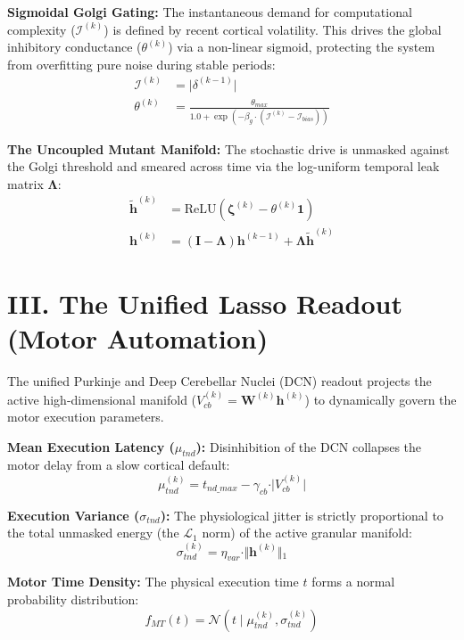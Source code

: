 \documentclass[11pt, a4paper]{article}
\begin{document}
\textbf{Sigmoidal Golgi Gating:} The instantaneous demand for computational complexity ($\mathcal{I}^{(k)}$) is defined by recent cortical volatility. This drives the global inhibitory conductance ($\theta^{(k)}$) via a non-linear sigmoid, protecting the system from overfitting pure noise during stable periods:
\begin{align}
\mathcal{I}^{(k)} &= \vert{}\delta^{(k-1)}\vert{} \\
\theta^{(k)} &= \frac{\theta_{max}}{1.0 + \exp\left(-\beta_g \cdot (\mathcal{I}^{(k)} - \mathcal{I}_{bias})\right)}
\end{align}

\textbf{The Uncoupled Mutant Manifold:} The stochastic drive is unmasked against the Golgi threshold and smeared across time via the log-uniform temporal leak matrix $\mathbf{\Lambda}$:
\begin{align}
\tilde{\mathbf{h}}^{(k)} &= \text{ReLU}\left( \mathbf{\zeta}^{(k)} - \theta^{(k)} \mathbf{1} \right) \\
\mathbf{h}^{(k)} &= (\mathbf{I} - \mathbf{\Lambda}) \mathbf{h}^{(k-1)} + \mathbf{\Lambda} \tilde{\mathbf{h}}^{(k)}
\end{align}

\section{III. The Unified Lasso Readout (Motor Automation)}
The unified Purkinje and Deep Cerebellar Nuclei (DCN) readout projects the active high-dimensional manifold ($V_{cb}^{(k)} = \mathbf{W}^{(k)} \mathbf{h}^{(k)}$) to dynamically govern the motor execution parameters.

\textbf{Mean Execution Latency ($\mu_{tnd}$):} Disinhibition of the DCN collapses the motor delay from a slow cortical default:
\begin{equation}
\mu_{tnd}^{(k)} = t_{nd\_max} - \gamma_{cb} \cdot \vert{}V_{cb}^{(k)}\vert{}
\end{equation}

\textbf{Execution Variance ($\sigma_{tnd}$):} The physiological jitter is strictly proportional to the total unmasked energy (the $\mathcal{L}_1$ norm) of the active granular manifold:
\begin{equation}
\sigma_{tnd}^{(k)} = \eta_{var} \cdot \Vert{}\mathbf{h}^{(k)}\Vert{}_1
\end{equation}

\textbf{Motor Time Density:} The physical execution time $t$ forms a normal probability distribution:
\begin{equation}
f_{MT}(t) = \mathcal{N}\left(t \mid \mu_{tnd}^{(k)}, \sigma_{tnd}^{(k)}\right)
\end{equation}
\end{document}

